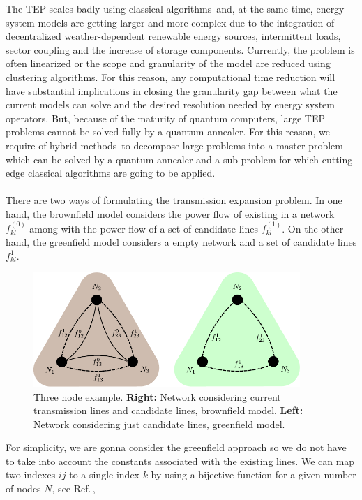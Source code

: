 The TEP scales badly using classical algorithms\,\cite{Oertel2014ComplexityEvaluation} and, at the same time, energy system models are getting larger and more complex due to the integration of decentralized weather-dependent renewable energy sources, intermittent loads, sector coupling and the increase of storage components. Currently, the problem is often linearized or the scope and granularity of the model are reduced using clustering algorithms. For this reason, any computational time reduction will have substantial implications in closing the granularity gap between what the current models can solve and the desired resolution needed by energy system operators. But, because of the maturity of quantum computers, large TEP problems cannot be solved fully by a quantum annealer. For this reason, we require of hybrid methods\,\cite{Dilwali2016,Binato2001,Huang2019,MacRae2016,Zhao2021HybridProgrammingb} to decompose large problems into a master problem which can be solved by a quantum annealer and a sub-problem for which cutting-edge classical algorithms are going to be applied.\\\\
There are two ways of formulating the transmission expansion problem. In one hand, the brownfield model considers the power flow of existing in a network $f_{kl}^{(0)}$ among with the power flow of a set of candidate lines $f_{kl}^{(1)}$. On the other hand, the greenfield model considers a empty network and a set of candidate lines $f_{kl}^{1}$.
\begin{figure}[H]
  \begin{center}
\includegraphics[width=0.9\textwidth]{Figures/3NodeBrownGreen.pdf}
  \end{center}
  \caption{Three node example. \textbf{Right:} Network considering current transmission lines and candidate lines, brownfield model. \textbf{Left:} Network considering just candidate lines, greenfield model.}
  \label{fig: ThreeNode}
\end{figure}
For simplicity, we are gonna consider the greenfield approach so we do not have to take into account the constants associated with the existing lines. We can map two indexes $ij$ to a single index $k$ by using a bijective function for a given number of nodes $N$, see Ref.\,\cite{Jain2021SolvingComputer},

